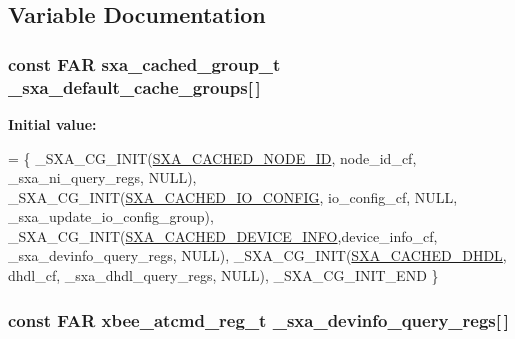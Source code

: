 \subsection{Variable Documentation}
\hypertarget{group___s_x_a_ga88c9810bd98b37f572f8fb294cb02349}{
\subsubsection[{\-\_\-sxa\-\_\-default\-\_\-cache\-\_\-groups}]{\setlength{\rightskip}{0pt plus 5cm}const {\bf F\-A\-R} {\bf sxa\-\_\-cached\-\_\-group\-\_\-t} \-\_\-sxa\-\_\-default\-\_\-cache\-\_\-groups\mbox{[}$\,$\mbox{]}}}\label{group___s_x_a_ga88c9810bd98b37f572f8fb294cb02349}
{\bfseries Initial value\-:}
\begin{DoxyCode}
=
\{
   \_SXA\_CG\_INIT(\hyperlink{group___s_x_a_ggabed82baf7f470b522273a3e37c24c600a8d6b7f78660e6b7da06d0fa99dfb6df6}{SXA\_CACHED\_NODE\_ID},    node\_id\_cf,       
      \_sxa\_ni\_query\_regs,          NULL),
   \_SXA\_CG\_INIT(\hyperlink{group___s_x_a_ggabed82baf7f470b522273a3e37c24c600a8f3afd72952b8d47c03b1c9c4ea76622}{SXA\_CACHED\_IO\_CONFIG},   io\_config\_cf,     
      NULL,                     \_sxa\_update\_io\_config\_group),
   \_SXA\_CG\_INIT(\hyperlink{group___s_x_a_ggabed82baf7f470b522273a3e37c24c600a689a1dccc7c16583fec02c8d8c7ba35d}{SXA\_CACHED\_DEVICE\_INFO},device\_info\_cf,  
      \_sxa\_devinfo\_query\_regs,  NULL),
   \_SXA\_CG\_INIT(\hyperlink{group___s_x_a_ggabed82baf7f470b522273a3e37c24c600a0ad9240e8ef31156d92883213e899924}{SXA\_CACHED\_DHDL},       dhdl\_cf,          
      \_sxa\_dhdl\_query\_regs,     NULL),
   \_SXA\_CG\_INIT\_END
\}
\end{DoxyCode}
\hypertarget{group___s_x_a_ga96cff97476dfc4ddb18bfd8b65731472}{
\subsubsection[{\-\_\-sxa\-\_\-devinfo\-\_\-query\-\_\-regs}]{\setlength{\rightskip}{0pt plus 5cm}const {\bf F\-A\-R} {\bf xbee\-\_\-atcmd\-\_\-reg\-\_\-t} \-\_\-sxa\-\_\-devinfo\-\_\-query\-\_\-regs\mbox{[}$\,$\mbox{]}}}\label{group___s_x_a_ga96cff97476dfc4ddb18bfd8b65731472}
